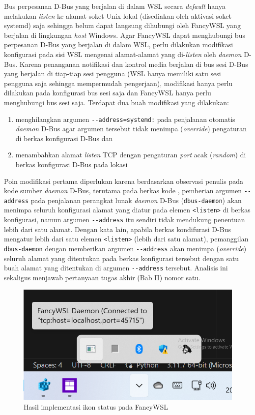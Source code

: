 Bus perpesanan D-Bus yang berjalan di dalam WSL secara \textit{default} hanya melakukan \textit{listen} ke alamat soket Unix lokal (disediakan oleh aktivasi soket systemd) saja sehingga belum dapat langsung dihubungi oleh FancyWSL yang berjalan di lingkungan \textit{host} Windows. Agar FancyWSL dapat menghubungi bus perpesanan D-Bus yang berjalan di dalam WSL, perlu dilakukan modifikasi konfigurasi pada sisi WSL mengenai alamat-alamat yang di-\textit{listen} oleh \textit{daemon} D-Bus. Karena penanganan notifikasi dan kontrol media berjalan di bus sesi D-Bus yang berjalan di tiap-tiap sesi pengguna (WSL hanya memiliki satu sesi pengguna saja sehingga mempermudah pengerjaan), modifikasi hanya perlu dilakukan pada konfigurasi bus sesi saja dan FancyWSL hanya perlu menghubungi bus sesi saja. Terdapat dua buah modifikasi yang dilakukan:
\begin{enumerate}
    \item menghilangkan argumen \verb|--address=systemd:| pada penjalanan otomatis \textit{daemon} D-Bus agar argumen tersebut tidak menimpa (\textit{override}) pengaturan di berkas konfigurasi D-Bus dan
    \item menambahkan alamat \textit{listen} TCP dengan pengaturan \textit{port} acak (\textit{random}) di berkas konfigurasi D-Bus pada lokasi 
\end{enumerate}
Poin modifikasi pertama diperlukan karena berdasarkan observasi penulis pada kode sumber \textit{daemon} D-Bus, terutama pada berkas kode  \cite{dbus-source-code-address-argumen-and-listen-config}, pemberian argumen \verb|--address| pada penjalanan perangkat lunak \textit{daemon} D-Bus (\verb|dbus-daemon|) akan menimpa seluruh konfigurasi alamat yang diatur pada elemen \verb|<listen>| di berkas konfigurasi, namun argumen \verb|--address| itu sendiri tidak mendukung penentuan lebih dari satu alamat. Dengan kata lain, apabila berkas kondifurasi D-Bus mengatur lebih dari satu elemen \verb|<listen>| (lebih dari satu alamat), pemanggilan \verb|dbus-daemon| dengan memberikan argumen \verb|--address| akan menimpa (\textit{override}) seluruh alamat yang ditentukan pada berkas konfigurasi tersebut dengan satu buah alamat yang ditentukan di argumen \verb|--address| tersebut. Analisis ini sekaligus menjawab pertanyaan tugas akhir (Bab II) nomor satu.

\begin{figure}
    \centering
    \includegraphics[width=0.5\linewidth]{assets/Screenshot 2023-12-20 114455.png}
    \caption{Hasil implementasi ikon status pada FancyWSL}
\end{figure}

